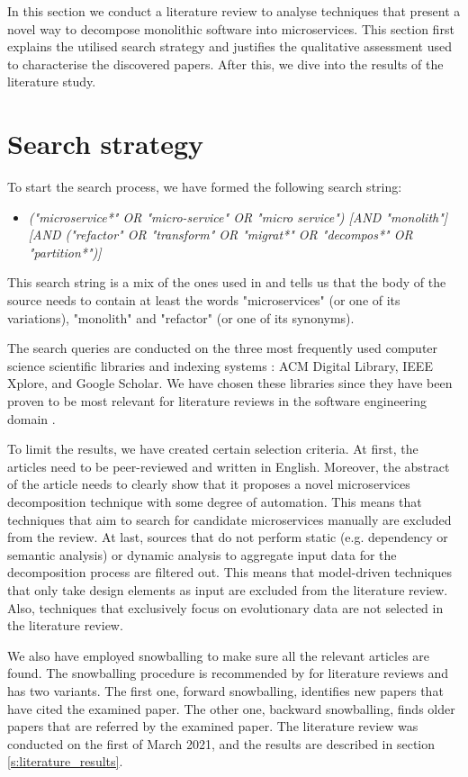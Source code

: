 In this section we conduct a literature review to analyse techniques that present a novel way to decompose monolithic software into microservices. This section first explains the utilised search strategy and justifies the qualitative assessment used to characterise the discovered papers. After this, we dive into the results of the literature study.

\section{Search strategy}\label{s:search_strategy}
To start the search process, we have formed the following search string: 

\begin{itemize}
    \item[] \textit{("microservice*" OR "micro-service" OR "micro service") [AND "monolith"] [AND ("refactor" OR "transform" OR "migrat*" OR "decompos*" OR "partition*")]}
\end{itemize}
This search string is a mix of the ones used in \cite{fritzsch2018monolith} \cite{ponce2019migrating} and tells us that the body of the source needs to contain at least the words "microservices" (or one of its variations), "monolith" and "refactor" (or one of its synonyms). \par
The search queries are conducted on the three most frequently used computer science scientific libraries and indexing systems \cite{fritzsch2018monolith}: ACM Digital Library, IEEE Xplore, and Google Scholar. We have chosen these libraries since they have been proven to be most relevant for literature reviews in the software engineering domain \cite{petersen2015guidelines}. \par
To limit the results, we have created certain selection criteria. At first, the articles need to be peer-reviewed and written in English. Moreover, the abstract of the article needs to clearly show that it proposes a novel microservices decomposition technique with some degree of automation. This means that techniques that aim to search for candidate microservices manually are excluded from the review. At last, sources that do not perform static (e.g. dependency or semantic analysis) or dynamic analysis to aggregate input data for the decomposition process are filtered out. This means that model-driven techniques that only take design elements as input are excluded from the literature review. Also, techniques that exclusively focus on evolutionary data are not selected in the literature review. \par
We also have employed snowballing to make sure all the relevant articles are found. The snowballing procedure is recommended by \citeauthor{wohlin2014guidelines} \cite{wohlin2014guidelines} for literature reviews and has two variants. The first one, forward snowballing, identifies new papers that have cited the examined paper. The other one, backward snowballing, finds older papers that are referred by the examined paper. The literature review was conducted on the first of March 2021, and the results are described in section \ref{s:literature_results}.

